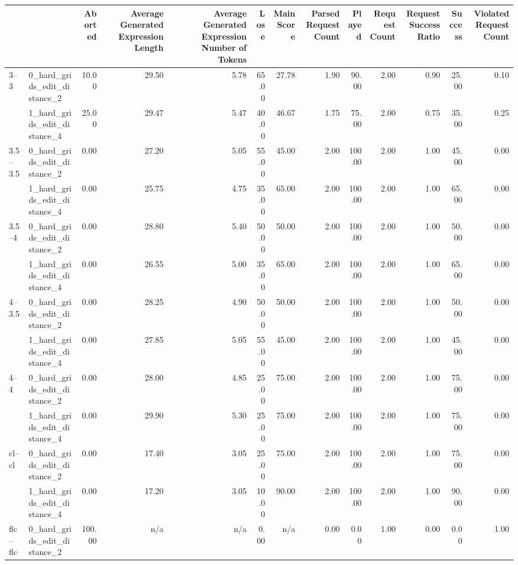 \begin{tabular}{llrrrrrrrrrrr}
\toprule
 &  & Aborted & Average Generated Expression Length & Average Generated Expression Number of Tokens & Lose & Main Score & Parsed Request Count & Played & Request Count & Request Success Ratio & Success & Violated Request Count \\
\midrule
\multirow[t]{2}{*}{3--3} & 0_hard_grids_edit_distance_2 & 10.00 & 29.50 & 5.78 & 65.00 & 27.78 & 1.90 & 90.00 & 2.00 & 0.90 & 25.00 & 0.10 \\
 & 1_hard_grids_edit_distance_4 & 25.00 & 29.47 & 5.47 & 40.00 & 46.67 & 1.75 & 75.00 & 2.00 & 0.75 & 35.00 & 0.25 \\
\cline{1-13}
\multirow[t]{2}{*}{3.5--3.5} & 0_hard_grids_edit_distance_2 & 0.00 & 27.20 & 5.05 & 55.00 & 45.00 & 2.00 & 100.00 & 2.00 & 1.00 & 45.00 & 0.00 \\
 & 1_hard_grids_edit_distance_4 & 0.00 & 25.75 & 4.75 & 35.00 & 65.00 & 2.00 & 100.00 & 2.00 & 1.00 & 65.00 & 0.00 \\
\cline{1-13}
\multirow[t]{2}{*}{3.5--4} & 0_hard_grids_edit_distance_2 & 0.00 & 28.80 & 5.40 & 50.00 & 50.00 & 2.00 & 100.00 & 2.00 & 1.00 & 50.00 & 0.00 \\
 & 1_hard_grids_edit_distance_4 & 0.00 & 26.55 & 5.00 & 35.00 & 65.00 & 2.00 & 100.00 & 2.00 & 1.00 & 65.00 & 0.00 \\
\cline{1-13}
\multirow[t]{2}{*}{4--3.5} & 0_hard_grids_edit_distance_2 & 0.00 & 28.25 & 4.90 & 50.00 & 50.00 & 2.00 & 100.00 & 2.00 & 1.00 & 50.00 & 0.00 \\
 & 1_hard_grids_edit_distance_4 & 0.00 & 27.85 & 5.05 & 55.00 & 45.00 & 2.00 & 100.00 & 2.00 & 1.00 & 45.00 & 0.00 \\
\cline{1-13}
\multirow[t]{2}{*}{4--4} & 0_hard_grids_edit_distance_2 & 0.00 & 28.00 & 4.85 & 25.00 & 75.00 & 2.00 & 100.00 & 2.00 & 1.00 & 75.00 & 0.00 \\
 & 1_hard_grids_edit_distance_4 & 0.00 & 29.90 & 5.30 & 25.00 & 75.00 & 2.00 & 100.00 & 2.00 & 1.00 & 75.00 & 0.00 \\
\cline{1-13}
\multirow[t]{2}{*}{cl--cl} & 0_hard_grids_edit_distance_2 & 0.00 & 17.40 & 3.05 & 25.00 & 75.00 & 2.00 & 100.00 & 2.00 & 1.00 & 75.00 & 0.00 \\
 & 1_hard_grids_edit_distance_4 & 0.00 & 17.20 & 3.05 & 10.00 & 90.00 & 2.00 & 100.00 & 2.00 & 1.00 & 90.00 & 0.00 \\
\cline{1-13}
\multirow[t]{2}{*}{flc--flc} & 0_hard_grids_edit_distance_2 & 100.00 & n/a & n/a & 0.00 & n/a & 0.00 & 0.00 & 1.00 & 0.00 & 0.00 & 1.00 \\

\end{tabular}
